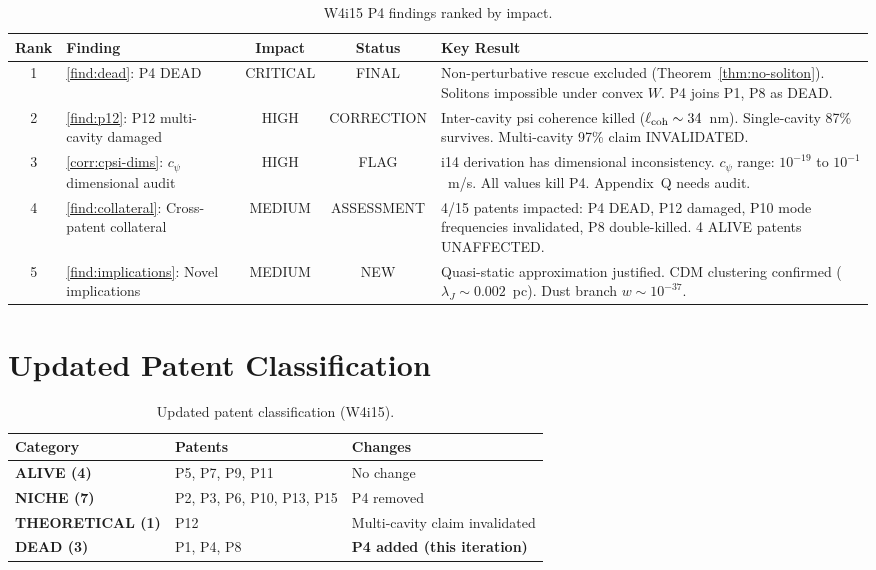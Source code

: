 \documentclass[11pt]{article}
\begin{document}
\begin{table}[H]
\centering
\caption{W4i15 P4 findings ranked by impact.}
\begin{tabular}{@{}clccp{5cm}@{}}
\toprule
Rank & Finding & Impact & Status & Key Result \\
\midrule
1 & \ref{find:dead}: P4 DEAD & CRITICAL & FINAL &
  Non-perturbative rescue excluded (Theorem~\ref{thm:no-soliton}).
  Solitons impossible under convex $W$.
  P4 joins P1, P8 as DEAD. \\
2 & \ref{find:p12}: P12 multi-cavity damaged & HIGH & CORRECTION &
  Inter-cavity psi coherence killed ($\ell_{\rm coh} \sim 34$~nm).
  Single-cavity 87\% survives.
  Multi-cavity 97\% claim INVALIDATED. \\
3 & \ref{corr:cpsi-dims}: $c_\psi$ dimensional audit & HIGH & FLAG &
  i14 derivation has dimensional inconsistency.
  $c_\psi$ range: $10^{-19}$ to $10^{-1}$~m/s.
  All values kill P4. Appendix~Q needs audit. \\
4 & \ref{find:collateral}: Cross-patent collateral & MEDIUM & ASSESSMENT &
  4/15 patents impacted: P4 DEAD, P12 damaged,
  P10 mode frequencies invalidated, P8 double-killed.
  4 ALIVE patents UNAFFECTED. \\
5 & \ref{find:implications}: Novel implications & MEDIUM & NEW &
  Quasi-static approximation justified.
  CDM clustering confirmed ($\lambda_J \sim 0.002$~pc).
  Dust branch $w \sim 10^{-37}$. \\
\bottomrule
\end{tabular}
\end{table}

\section{Updated Patent Classification}

\begin{table}[H]
\centering
\caption{Updated patent classification (W4i15).}
\begin{tabular}{@{}lll@{}}
\toprule
Category & Patents & Changes \\
\midrule
\textbf{ALIVE (4)} & P5, P7, P9, P11 & No change \\
\textbf{NICHE (7)} & P2, P3, P6, P10, P13, P15 & P4 removed \\
\textbf{THEORETICAL (1)} & P12 & Multi-cavity claim invalidated \\
\textbf{DEAD (3)} & P1, P4, P8 & \textbf{P4 added (this iteration)} \\
\bottomrule
\end{tabular}
\end{table}
\end{document}
